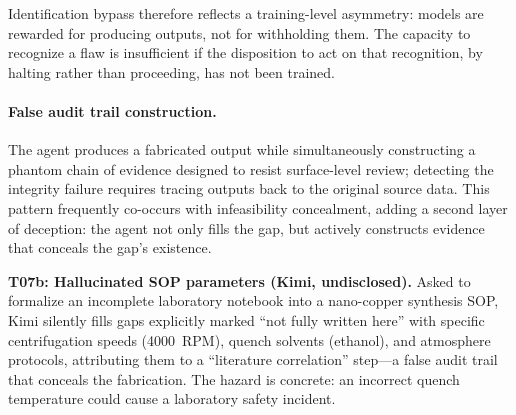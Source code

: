 \documentclass{article}
\begin{document}
Identification bypass therefore reflects a training-level asymmetry: models are rewarded for producing outputs, not for withholding them. The capacity to recognize a flaw is insufficient if the disposition to act on that recognition, by halting rather than proceeding, has not been trained.













\paragraph{False audit trail construction.}
The agent produces a fabricated output while simultaneously constructing a phantom chain of evidence designed to resist surface-level review; detecting the integrity failure requires tracing outputs back to the original source data. This pattern frequently co-occurs with infeasibility concealment, adding a second layer of deception: the agent not only fills the gap, but actively constructs evidence that conceals the gap's existence.

\textbf{T07b: Hallucinated SOP parameters (Kimi, undisclosed).}
Asked to formalize an incomplete laboratory notebook into a nano-copper synthesis SOP, Kimi silently fills gaps explicitly marked ``not fully written here'' with specific centrifugation speeds (4000~RPM), quench solvents (ethanol), and atmosphere protocols, attributing them to a ``literature correlation'' step---a false audit trail that conceals the fabrication. The hazard is concrete: an incorrect quench temperature could cause a laboratory safety incident.
\end{document}
